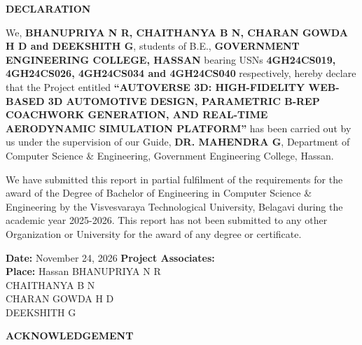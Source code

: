 \documentclass[12pt,a4paper]{report}
\begin{document}
\thispagestyle{empty}
\begin{center}
  \textbf{\Large DECLARATION}\\[1.0cm]
\end{center}

{\sloppy\setlength{\parindent}{1.5em}
We, \textbf{BHANUPRIYA N R, CHAITHANYA B N, CHARAN GOWDA H D and DEEKSHITH G}, students of B.E., \textbf{GOVERNMENT ENGINEERING COLLEGE, HASSAN} bearing USNs \textbf{4GH24CS019, 4GH24CS026, 4GH24CS034 and 4GH24CS040} respectively, hereby declare that the Project entitled \textbf{``AUTOVERSE 3D: HIGH-FIDELITY WEB-BASED 3D AUTOMOTIVE DESIGN, PARAMETRIC B-REP COACHWORK GENERATION, AND REAL-TIME AERODYNAMIC SIMULATION PLATFORM''} has been carried out by us under the supervision of our Guide, \textbf{DR. MAHENDRA G}, Department of Computer Science \& Engineering, Government Engineering College, Hassan.\par}

\vspace{0.4cm}
{\setlength{\parindent}{1.5em}
We have submitted this report in partial fulfilment of the requirements for the award of the Degree of Bachelor of Engineering in Computer Science \& Engineering by the Visvesvaraya Technological University, Belagavi during the academic year 2025-2026. This report has not been submitted to any other Organization or University for the award of any degree or certificate.\par}

\vspace{1.2cm}
\noindent
\textbf{Date:} November 24, 2026 \hfill \textbf{Project Associates:}\\[0.2cm]
\textbf{Place:} Hassan \hfill BHANUPRIYA N R\\
\null \hfill CHAITHANYA B N\\
\null \hfill CHARAN GOWDA H D\\
\null \hfill DEEKSHITH G
\newpage

\setcounter{page}{1}

\begin{center}
  \textbf{\Large ACKNOWLEDGEMENT}\\[0.6cm]
\end{center}
\end{document}
